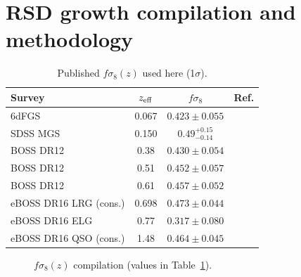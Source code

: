 \documentclass[aps,prd,twocolumn,amsmath,amssymb,nofootinbib,superscriptaddress]{revtex4-2}
\begin{document}
\section{RSD growth compilation and methodology}
\begin{table}[t]
\begingroup\small
\centering
\caption{Published $f\sigma_8(z)$ used here (1$\sigma$).}
\label{tab:rsd_fs8}
\begin{tabular}{lccc}
\toprule
Survey & $z_{\rm eff}$ & $f\sigma_8$ & Ref. \\
\midrule
6dFGS & 0.067 & $0.423 \pm 0.055$ & \cite{Beutler6dFGS} \\
SDSS MGS & 0.150 & $0.49^{+0.15}_{-0.14}$ & \cite{HowlettMGS} \\
BOSS DR12 & 0.38 & $0.430 \pm 0.054$ & \cite{SatpathyDR12} \\
BOSS DR12 & 0.51 & $0.452 \pm 0.057$ & \cite{SatpathyDR12} \\
BOSS DR12 & 0.61 & $0.457 \pm 0.052$ & \cite{SatpathyDR12} \\
eBOSS DR16 LRG (cons.) & 0.698 & $0.473 \pm 0.044$ & \cite{GilMarinLRG} \\
eBOSS DR16 ELG & 0.77 & $0.317 \pm 0.080$ & \cite{ZhaoDR16ELG} \\
eBOSS DR16 QSO (cons.) & 1.48 & $0.464 \pm 0.045$ & \cite{HouQSO} \\
\bottomrule
\end{tabular}
\endgroup
\end{table}

\begin{figure}[t]
\centering
{}
\caption{$f\sigma_8(z)$ compilation (values in Table~\ref{tab:rsd_fs8}).}
\end{figure}
\end{document}
